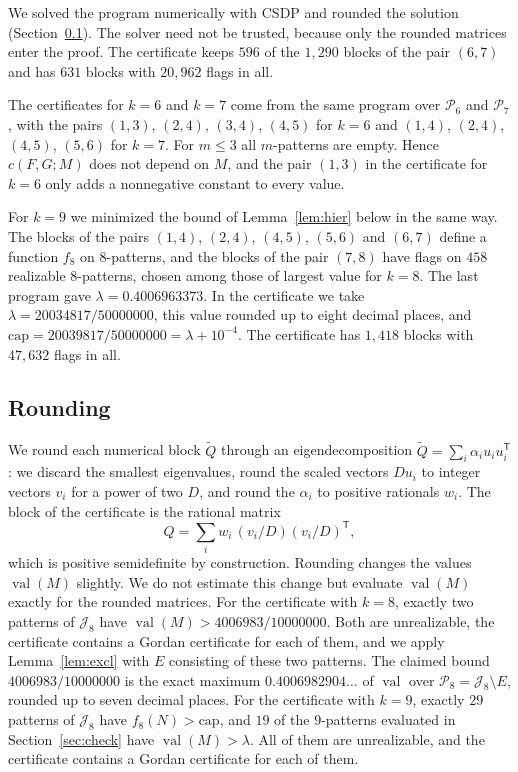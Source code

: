 \documentclass[11pt]{amsart}
\theoremstyle{definition}
\theoremstyle{remark}
\numberwithin{equation}{section}
\newcommand{\cP}{\mathcal{P}}
\newcommand{\cJ}{\mathcal{J}}
\newcommand{\val}{\operatorname{val}}
\newcommand{\capv}{\mathrm{cap}}
\newcommand{\BOUNDF}{20034817/50000000}
\newcommand{\CAPF}{20039817/50000000}
\newcommand{\NEXCLEIGHT}{29}
\newcommand{\NEXCLNINE}{19}
\newcommand{\NCORE}{458}
\newcommand{\NBLKNINE}{1{,}418}
\newcommand{\NFLAGNINE}{47{,}632}
\newcommand{\BOUNDEIGHTF}{4006983/10000000}
\newcommand{\EXMAXEIGHT}{0.4006982904\ldots}
\newcommand{\NTOPBLK}{596}
\newcommand{\NBLK}{631}
\begin{document}
We solved the program numerically with CSDP \cite{Bor99} and rounded the solution (Section~\ref{sec:round}). The solver need not be trusted, because only the rounded matrices enter the proof. The certificate keeps $\NTOPBLK$ of the $1{,}290$ blocks of the pair $(6,7)$ and has $\NBLK$ blocks with $20{,}962$ flags in all.

The certificates for $k=6$ and $k=7$ come from the same program over $\cP_6$ and $\cP_7$, with the pairs $(1,3)$, $(2,4)$, $(3,4)$, $(4,5)$ for $k=6$ and $(1,4)$, $(2,4)$, $(4,5)$, $(5,6)$ for $k=7$. For $m\le3$ all $m$-patterns are empty. Hence $c(F,G;M)$ does not depend on $M$, and the pair $(1,3)$ in the certificate for $k=6$ only adds a nonnegative constant to every value.

For $k=9$ we minimized the bound of Lemma~\ref{lem:hier} below in the same way. The blocks of the pairs $(1,4)$, $(2,4)$, $(4,5)$, $(5,6)$ and $(6,7)$ define a function $f_8$ on $8$-patterns, and the blocks of the pair $(7,8)$ have flags on $\NCORE$ realizable $8$-patterns, chosen among those of largest value for $k=8$. The last program gave $\lambda=0.4006963373$. In the certificate we take $\lambda=\BOUNDF$, this value rounded up to eight decimal places, and $\capv=\CAPF=\lambda+10^{-4}$. The certificate has $\NBLKNINE$ blocks with $\NFLAGNINE$ flags in all.

\subsection{Rounding}\label{sec:round}
We round each numerical block $\tilde Q$ through an eigendecomposition $\tilde Q=\sum_i\alpha_iu_iu_i^{\mathsf T}$: we discard the smallest eigenvalues, round the scaled vectors $Du_i$ to integer vectors $v_i$ for a power of two $D$, and round the $\alpha_i$ to positive rationals $w_i$. The block of the certificate is the rational matrix
\[
Q=\sum_iw_i\,(v_i/D)(v_i/D)^{\mathsf T},
\]
which is positive semidefinite by construction. Rounding changes the values $\val(M)$ slightly. We do not estimate this change but evaluate $\val(M)$ exactly for the rounded matrices. For the certificate with $k=8$, exactly two patterns of $\cJ_8$ have $\val(M)>\BOUNDEIGHTF$. Both are unrealizable, the certificate contains a Gordan certificate for each of them, and we apply Lemma~\ref{lem:excl} with $E$ consisting of these two patterns. The claimed bound $\BOUNDEIGHTF$ is the exact maximum $\EXMAXEIGHT$ of $\val$ over $\cP_8=\cJ_8\setminus E$, rounded up to seven decimal places. For the certificate with $k=9$, exactly $\NEXCLEIGHT$ patterns of $\cJ_8$ have $f_8(N)>\capv$, and $\NEXCLNINE$ of the $9$-patterns evaluated in Section~\ref{sec:check} have $\val(M)>\lambda$. All of them are unrealizable, and the certificate contains a Gordan certificate for each of them.
\end{document}
